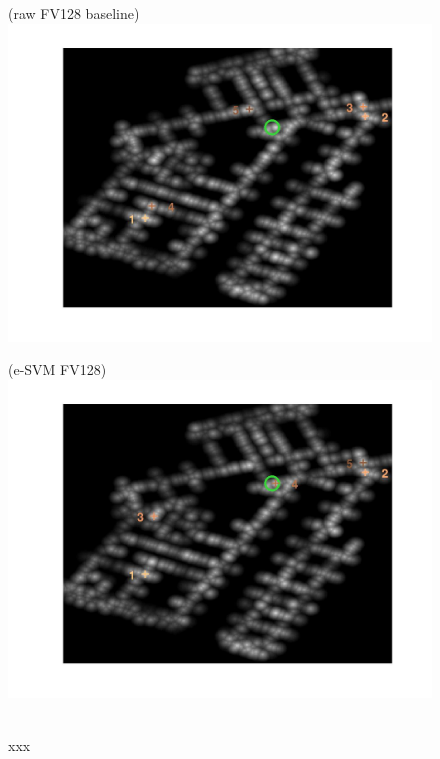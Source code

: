 \documentclass[10pt,onecolumn,A4]{article}
\begin{document}
\begin{figure}
	\begin{minipage}{0.45\linewidth}
		\center
		(raw FV128 baseline) \\
		\includegraphics[trim = 55mm 40mm 55mm 25mm, clip=true,width=\linewidth]{sup2602/heatRaw.jpg}
	\end{minipage} 
	\begin{minipage}{0.45\linewidth}
		\center
		(e-SVM FV128) \\
		\includegraphics[trim = 55mm 40mm 55mm 25mm, clip=true,width=\linewidth]{sup2602/heatSvm.jpg}
	\end{minipage} 
	\\
	\textcolor{myWhite}{xxx}\\

\end{figure}
\end{document}
